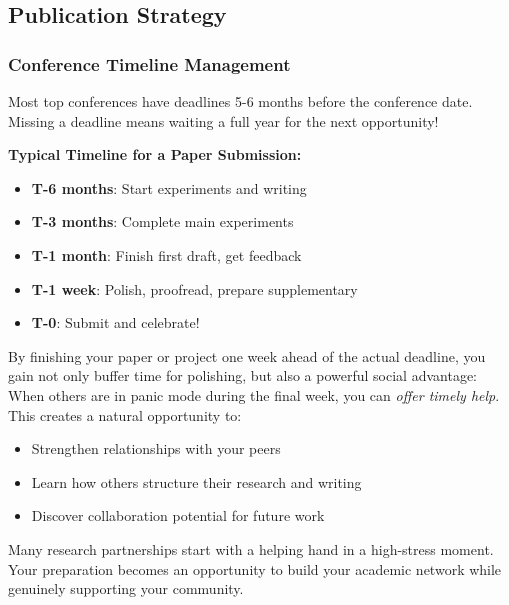 \documentclass[11pt,a4paper]{article}
\begin{document}
\subsection{Publication Strategy}

\subsubsection{Conference Timeline Management}

\begin{tcolorbox}[colback=red!10,colframe=red!50,title=Critical: Plan Your Submissions 6 Months Ahead]
Most top conferences have deadlines 5-6 months before the conference date. Missing a deadline means waiting a full year for the next opportunity!

\textbf{Typical Timeline for a Paper Submission:}
\begin{itemize}
    \item \textbf{T-6 months}: Start experiments and writing
    \item \textbf{T-3 months}: Complete main experiments
    \item \textbf{T-1 month}: Finish first draft, get feedback
    \item \textbf{T-1 week}: Polish, proofread, prepare supplementary
    \item \textbf{T-0}: Submit and celebrate!
\end{itemize}
\end{tcolorbox}

\begin{tcolorbox}[colback=yellow!10,colframe=goldenyellow,title=Pro Tip: Set Your Personal Deadline 1 Week Early]
By finishing your paper or project one week ahead of the actual deadline, you gain not only buffer time for polishing, but also a powerful social advantage: When others are in panic mode during the final week, you can \textit{offer timely help}. This creates a natural opportunity to:

\begin{itemize}
    \item Strengthen relationships with your peers
    \item Learn how others structure their research and writing  
    \item Discover collaboration potential for future work
\end{itemize}

Many research partnerships start with a helping hand in a high-stress moment. Your preparation becomes an opportunity to build your academic network while genuinely supporting your community.
\end{tcolorbox}
\end{document}
